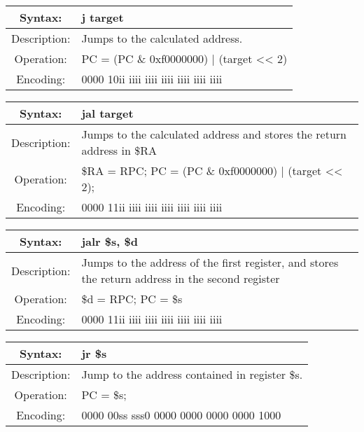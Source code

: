     \begin{table}[!hbp]
    \begin{tabularx}{\textwidth}{|c|X|}
        \hline
        Syntax: & j target \\
        \hline
        Description: & Jumps to the calculated address. \\
        \hline
        Operation: & PC = (PC \& 0xf0000000) | (target << 2) \\
        \hline
        Encoding: & 0000 10ii iiii iiii iiii iiii iiii iiii \\
        \hline
    \end{tabularx}
    \end{table}

    \begin{table}[!hbp]
    \begin{tabularx}{\textwidth}{|c|X|}
        \hline
        Syntax: & jal target \\
        \hline
        Description: & Jumps to the calculated address and stores the return address in \$RA \\
        \hline
        Operation: & \$RA = RPC; PC = (PC \& 0xf0000000) | (target << 2); \\
        \hline
        Encoding: & 0000 11ii iiii iiii iiii iiii iiii iiii \\
        \hline
    \end{tabularx}
    \end{table}

    \begin{table}[!hbp]
    \begin{tabularx}{\textwidth}{|c|X|}
        \hline
        Syntax: & jalr \$s, \$d \\
        \hline
        Description: & Jumps to the address of the first register,
                     and stores the return address in the second register \\
        \hline
        Operation: & \$d = RPC; PC = \$s \\
        \hline
        Encoding: & 0000 11ii iiii iiii iiii iiii iiii iiii \\
        \hline
    \end{tabularx}
    \end{table}

    \begin{table}[!hbp]
    \begin{tabularx}{\textwidth}{|c|X|}
        \hline
        Syntax: & jr \$s \\
        \hline
        Description: & Jump to the address contained in register \$s. \\
        \hline
        Operation: & PC = \$s; \\
        \hline
        Encoding: & 0000 00ss sss0 0000 0000 0000 0000 1000 \\
        \hline
    \end{tabularx}
    \end{table}

